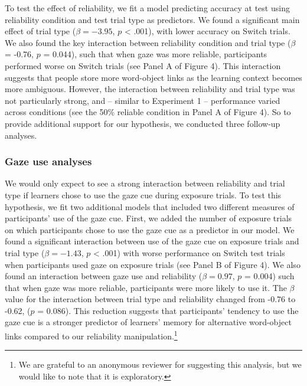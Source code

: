 \documentclass[oneside]{report}
\begin{document}
To test the effect of reliability, we fit a model predicting accuracy at
test using reliability condition and test trial type as predictors. We
found a significant main effect of trial type (\(\beta = -3.95\), \(p\)
\textless{} .001), with lower accuracy on Switch trials. We also found
the key interaction between reliability condition and trial type
(\(\beta\) = -0.76, \(p\) = 0.044), such that when gaze was more
reliable, participants performed worse on Switch trials (see Panel A of
Figure 4). This interaction suggests that people store more word-object
links as the learning context becomes more ambiguous. However, the
interaction between reliability and trial type was not particularly
strong, and -- similar to Experiment 1 -- performance varied across
conditions (see the 50\% reliable condition in Panel A of Figure 4). So
to provide additional support for our hypothesis, we conducted three
follow-up analyses.

\hypertarget{gaze-use-analyses}{%
\subsubsection{Gaze use analyses}\label{gaze-use-analyses}}

We would only expect to see a strong interaction between reliability and
trial type if learners chose to use the gaze cue during exposure trials.
To test this hypothesis, we fit two additional models that included two
different measures of participants' use of the gaze cue. First, we added
the number of exposure trials on which participants chose to use the
gaze cue as a predictor in our model. We found a significant interaction
between use of the gaze cue on exposure trials and trial type
(\(\beta = -1.43\), \(p\) \textless{} .001) with worse performance on
Switch test trials when participants used gaze on exposure trials (see
Panel B of Figure 4). We also found an interaction between gaze use and
reliability (\(\beta = 0.97\), \(p\) = 0.004) such that when gaze was
more reliable, participants were more likely to use it. The \(\beta\)
value for the interaction between trial type and reliability changed
from -0.76 to -0.62, (\(p\) = 0.086). This reduction suggests that
participants' tendency to use the gaze cue is a stronger predictor of
learners' memory for alternative word-object links compared to our
reliability manipulation.\footnote{We are grateful to an anonymous
  reviewer for suggesting this analysis, but we would like to note that
  it is exploratory.}
\end{document}
